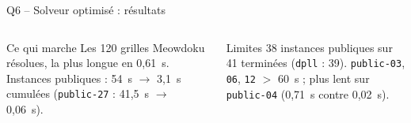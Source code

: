 \documentclass[aspectratio=169,11pt]{beamer}
\begin{document}
\begin{frame}{Q6 -- Solveur optimisé : résultats}
  \centering
  \medskip

  \raggedright
  \begin{columns}[T]
    \begin{exampleblock}{Ce qui marche}
      \small Les 120 grilles Meowdoku résolues, la plus longue en 0,61~s.
      Instances publiques : 54~s $\to$ 3,1~s cumulées (\texttt{public-27} : 41,5~s $\to$ 0,06~s).
    \end{exampleblock}
    \begin{alertblock}{Limites}
      \small 38 instances publiques sur 41 terminées (\texttt{dpll} : 39).
      \texttt{public-03}, \texttt{06}, \texttt{12} $>$ 60~s ; plus lent sur \texttt{public-04} (0,71~s contre 0,02~s).
    \end{alertblock}
  \end{columns}
\end{frame}
\end{document}
